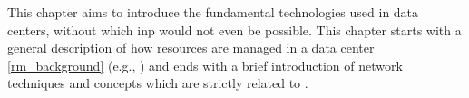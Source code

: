 This chapter aims to introduce the fundamental technologies used in data centers, without which \gls{inp} would not even be possible.
This chapter starts with a general description of how resources are managed in a data center \autoref{rm_background} (e.g., ) and ends with a brief introduction of network techniques and concepts which are strictly related to .